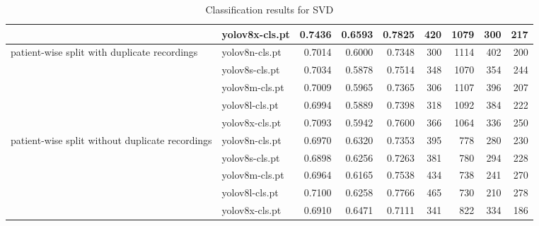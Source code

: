 \begin{table*}
\begin{tabular}{llrrrrrrr}
			 & yolov8x-cls.pt & 0.7436 & 0.6593 & 0.7825 & 420 & 1079 & 300 & 217 \\\midrule
			\multirow{5}{10em}{patient-wise split with duplicate recordings} & yolov8n-cls.pt & 0.7014 & 0.6000 & 0.7348 & 300 & 1114 & 402 & 200 \\
			 & yolov8s-cls.pt & 0.7034 & 0.5878 & 0.7514 & 348 & 1070 & 354 & 244 \\
			 & yolov8m-cls.pt & 0.7009 & 0.5965 & 0.7365 & 306 & 1107 & 396 & 207 \\
			 & yolov8l-cls.pt & 0.6994 & 0.5889 & 0.7398 & 318 & 1092 & 384 & 222 \\
			 & yolov8x-cls.pt & 0.7093 & 0.5942 & 0.7600 & 366 & 1064 & 336 & 250 \\\midrule
			\multirow{5}{10em}{patient-wise split without duplicate recordings} & yolov8n-cls.pt & 0.6970 & 0.6320 & 0.7353 & 395 & 778 & 280 & 230 \\
			 & yolov8s-cls.pt & 0.6898 & 0.6256 & 0.7263 & 381 & 780 & 294 & 228 \\
			 & yolov8m-cls.pt & 0.6964 & 0.6165 & 0.7538 & 434 & 738 & 241 & 270 \\
			 & yolov8l-cls.pt & 0.7100 & 0.6258 & 0.7766 & 465 & 730 & 210 & 278 \\
			 & yolov8x-cls.pt & 0.6910 & 0.6471 & 0.7111 & 341 & 822 & 334 & 186 \\
        \bottomrule
    \end{tabular}
    \caption{Classification results for SVD}
    \label{tab:svd_results}
\end{table*}